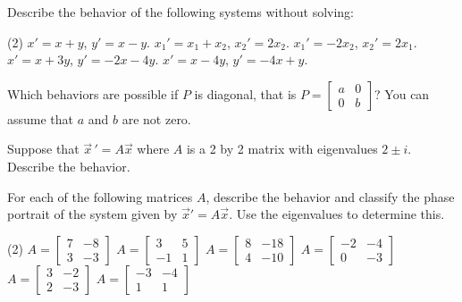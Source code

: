 \begin{exercise}\ansMark%
Describe the behavior of the following systems without solving:
\begin{tasks}(2)
\task $x' = x + y$, \quad $y' = x-y$.
\task $x_1' = x_1 + x_2$, \quad $x_2' = 2 x_2$.
\task $x_1' = -2x_2$, \quad $x_2' = 2 x_1$.
\task $x' = x + 3y$, \quad $y' = -2x-4y$.
\task $x' = x - 4y$, \quad $y' = -4x+y$.
\end{tasks}
\end{exercise}

\begin{exercise}
Which behaviors are possible if $P$ is diagonal, that is
$P = \left[ \begin{smallmatrix} a & 0 \\ 0 & b \end{smallmatrix} \right]$?
You can assume that $a$ and $b$ are not zero.
\end{exercise}

\begin{exercise}\ansMark%
Suppose that $\vec{x}\,' = A \vec{x}$ where $A$ is a 2 by 2 matrix
with eigenvalues $2\pm i$.  Describe the behavior.
\end{exercise}

\begin{exercise}\ansMark\label{ex:TwoDimSys1}%
For each of the following matrices $A$, describe the behavior and classify the phase portrait of the system given by ${\vec{x}}' = A\vec{x}$. Use the eigenvalues to determine this.
\begin{tasks}(2)
\task $A = \begin{bmatrix} 7 & -8 \\ 3 & -3 \end{bmatrix}$
\task $A = \begin{bmatrix} 3 & 5 \\ -1 & 1 \end{bmatrix}$
\task $A = \begin{bmatrix} 8 & -18 \\ 4 & -10 \end{bmatrix}$
\task $A = \begin{bmatrix} -2 & -4 \\0 & -3 \end{bmatrix}$
\task $A = \begin{bmatrix} 3 & -2 \\ 2 & -3 \end{bmatrix}$
\task $A = \begin{bmatrix} -3 & -4 \\ 1 & 1 \end{bmatrix}$
\end{tasks}
\end{exercise}

